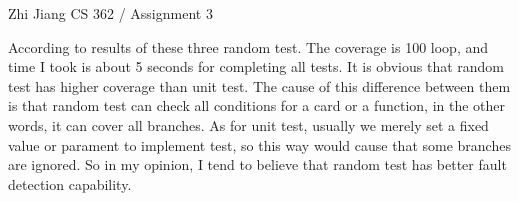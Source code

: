 Zhi Jiang
CS 362 / Assignment 3

According to results of these three random test. The coverage is 100%
loop, and time I took is about 5 seconds for completing all tests. It is obvious that random test has higher coverage
than unit test. The cause of this difference between them is that random test can check all conditions for a card or a 
function, in the other words, it can cover all branches. As for unit test, usually we merely set a fixed value or parament
to implement test, so this way would cause that some branches are ignored. So in my opinion, I tend to believe that random
test has better fault detection capability.
